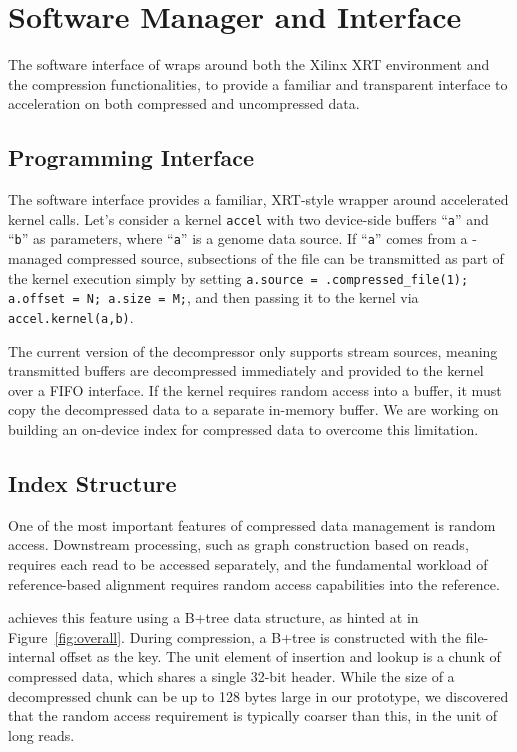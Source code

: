 \section{Software Manager and Interface}
\label{sec:software}

The software interface of \name{} wraps around both the Xilinx XRT environment and the compression functionalities, to provide a familiar and transparent interface to acceleration on both compressed and uncompressed data.

\subsection{Programming Interface}

The \name{} software interface provides a familiar, XRT-style wrapper around accelerated kernel calls.
Let's consider a kernel \texttt{accel} with two device-side buffers ``\texttt{a}'' and ``\texttt{b}'' as parameters, where ``\texttt{a}'' is a genome data source.
If ``\texttt{a}'' comes from a \name{}-managed compressed source, subsections of the file can be transmitted as part of the kernel execution simply by setting \texttt{a.source = \name{}.compressed\_file(1); a.offset = N; a.size = M;}, and then passing it to the kernel via \texttt{accel.kernel(a,b)}.

The current version of the \name{} decompressor only supports stream sources, meaning transmitted buffers are decompressed immediately and provided to the kernel over a FIFO interface.
If the kernel requires random access into a buffer, it must copy the decompressed data to a separate in-memory buffer.
We are working on building an on-device index for compressed data to overcome this limitation.


\subsection{Index Structure}

One of the most important features of compressed data management is random access.
Downstream processing, such as graph construction based on reads, requires each read to be accessed separately, and the fundamental workload of reference-based alignment requires random access capabilities into the reference.

\name{} achieves this feature using a B+tree data structure, as hinted at in Figure~\ref{fig:overall}.
During compression, a B+tree is constructed with the file-internal offset as the key.
The unit element of insertion and lookup is a chunk of compressed data, which shares a single 32-bit header.
While the size of a decompressed chunk can be up to 128 bytes large in our prototype, we discovered that the random access requirement is typically coarser than this, in the unit of long reads.


